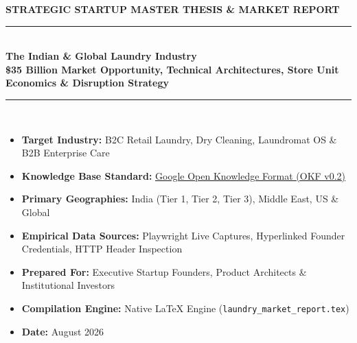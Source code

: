 \documentclass[11pt,a4paper]{article}
\begin{document}
\begin{titlepage}
    \centering
    \vspace*{0.5cm}
    
    {\color{blueaccent}\Large\bfseries STRATEGIC STARTUP MASTER THESIS \& MARKET REPORT}\\[0.4cm]
    \rule{\linewidth}{1.5pt}\\[0.5cm]
    
    {\color{navyblue}\Huge\bfseries The Indian \& Global Laundry Industry}\\[0.3cm]
    {\color{navyblue}\LARGE\bfseries \$35 Billion Market Opportunity, Technical Architectures, Store Unit Economics \& Disruption Strategy}\\[0.5cm]
    \rule{\linewidth}{1.5pt}\\[1.5cm]
    
    \begin{tcolorbox}[colback=bluebg,colframe=blueaccent,title=\textbf{Document Metadata \& Provenance:}]
        \begin{itemize}[leftmargin=*]
            \item \textbf{Target Industry:} B2C Retail Laundry, Dry Cleaning, Laundromat OS \& B2B Enterprise Care
            \item \textbf{Knowledge Base Standard:} \href{file:///c:/projects/laundry/research/okf/index.md}{\underline{Google Open Knowledge Format (OKF v0.2)}}
            \item \textbf{Primary Geographies:} India (Tier 1, Tier 2, Tier 3), Middle East, US \& Global
            \item \textbf{Empirical Data Sources:} Playwright Live Captures, Hyperlinked Founder Credentials, HTTP Header Inspection
            \item \textbf{Prepared For:} Executive Startup Founders, Product Architects \& Institutional Investors
            \item \textbf{Compilation Engine:} Native LaTeX Engine (\texttt{laundry\_market\_report.tex})
            \item \textbf{Date:} August 2026
        \end{itemize}
    \end{tcolorbox}
    
    \vfill
    

\end{titlepage}
\end{document}
